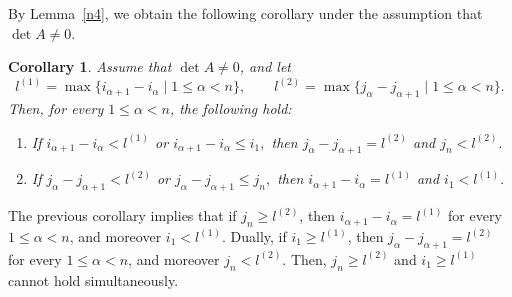 \documentclass[11pt,reqno]{amsart}
\theoremstyle{plain}
\newtheorem{cor}[thm]{Corollary}
\theoremstyle{remark}
\theoremstyle{definition}
\begin{document}
By Lemma~\ref{n4}, we obtain the following corollary under the assumption that $\det A\neq 0$.

\begin{cor}\label{n4cor}
Assume that $\det A\neq0$, and let
\[l^{(1)}=\max\{i_{\alpha+1}-i_\alpha\mid 1\leq\alpha<n\},
\qquad
l^{(2)}=\max\{j_\alpha-j_{\alpha+1}\mid 1\leq\alpha<n\}.\]
Then, for every $1\leq\alpha<n$, the following hold:
\begin{enumerate}
\item
If
\(i_{\alpha+1}-i_\alpha<l^{(1)}\)
or
\(i_{\alpha+1}-i_\alpha\leq i_1,\)
then
\(j_\alpha-j_{\alpha+1}=l^{(2)}\)
and
\(j_n<l^{(2)}.\)

\item
If
\(j_\alpha-j_{\alpha+1}<l^{(2)}\)
or
\(j_\alpha-j_{\alpha+1}\leq j_n,\)
then
\(i_{\alpha+1}-i_\alpha=l^{(1)}\)
and
\(i_1<l^{(1)}.\)
\end{enumerate}
\end{cor}

The previous corollary implies that if $j_n\geq l^{(2)}$, then
\(i_{\alpha+1}-i_\alpha=l^{(1)}\)
for every $1\leq\alpha<n$, and moreover $i_1<l^{(1)}$. Dually, if $i_1\geq l^{(1)}$, then
\(j_\alpha-j_{\alpha+1}=l^{(2)}\)
for every $1\leq\alpha<n$, and moreover $j_n<l^{(2)}$. Then,
\(j_n\geq l^{(2)}\) and \(i_1\geq l^{(1)}\)
cannot hold simultaneously.
\end{document}
